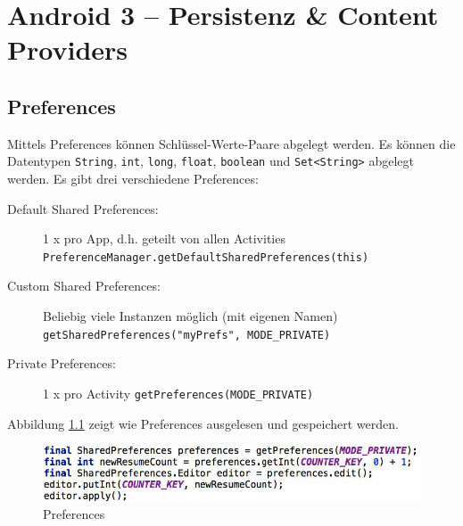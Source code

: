 \chapter{Android 3 – Persistenz \& Content Providers}

\section{Preferences}

Mittels Preferences können Schlüssel-Werte-Paare abgelegt werden. Es können die Datentypen \texttt{String}, \texttt{int}, \texttt{long}, \texttt{float}, \texttt{boolean} und \texttt{Set<String>} abgelegt werden. Es gibt drei verschiedene Preferences:
\begin{description}
	\item[Default Shared Preferences:] 1 x pro App, d.h. geteilt von allen Activities \\ \texttt{PreferenceManager.getDefaultSharedPreferences(this)}
	\item[Custom Shared Preferences:] Beliebig viele Instanzen möglich (mit eigenen Namen) \\ \texttt{getSharedPreferences("myPrefs", MODE\_PRIVATE)}
	\item[Private Preferences:] 1 x pro Activity \texttt{getPreferences(MODE\_PRIVATE)}
\end{description}
Abbildung \ref{fig:preferences} zeigt wie Preferences ausgelesen und gespeichert werden.
\begin{figure}
\centering
\includegraphics[width=\linewidth]{fig/preferences}
\caption{Preferences}
\label{fig:preferences}
\end{figure}

